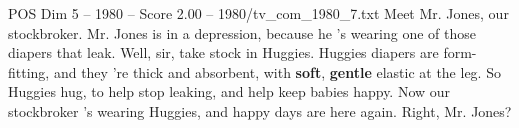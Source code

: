 \begin{textsample}{POS Dim 5 – 1980 – Score 2.00 – 1980/tv\_com\_1980\_7.txt}  \label{ex:f5_pos_007}
Meet Mr.
Jones, our stockbroker.
Mr.
Jones is in a depression, because he 's wearing one of those diapers that leak.
Well, sir, take stock in Huggies.
Huggies diapers are form-fitting, and they 're thick and absorbent, with \textbf{soft}, \textbf{gentle} elastic at the leg.
So Huggies hug, to help stop leaking, and help keep babies happy.
Now our stockbroker 's wearing Huggies, and happy days are here again.
Right, Mr.
Jones?

\end{textsample}
